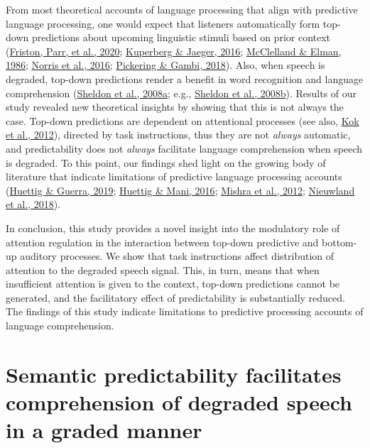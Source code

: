 \documentclass[a4paper, nobind]{templates/ociamthesis}
\begin{document}
From most theoretical accounts of language processing that align with predictive language processing, one would expect that listeners automatically form top-down predictions about upcoming linguistic stimuli based on prior context (\protect\hyperlink{ref-Friston2020}{Friston, Parr, et al., 2020}; \protect\hyperlink{ref-Kuperberg2016}{Kuperberg \& Jaeger, 2016}; \protect\hyperlink{ref-Mcclelland1986}{McClelland \& Elman, 1986}; \protect\hyperlink{ref-Norris2016}{Norris et al., 2016}; \protect\hyperlink{ref-Pickering2018}{Pickering \& Gambi, 2018}).
Also, when speech is degraded, top-down predictions render a benefit in word recognition and language comprehension (\protect\hyperlink{ref-Sheldon2008a}{Sheldon et al., 2008a}; e.g., \protect\hyperlink{ref-Sheldon2008b}{Sheldon et al., 2008b}).
Results of our study revealed new theoretical insights by showing that this is not always the case.
Top-down predictions are dependent on attentional processes (see also, \protect\hyperlink{ref-Kok2012}{Kok et al., 2012}), directed by task instructions, thus they are not \emph{always} automatic, and predictability does not \emph{always} facilitate language comprehension when speech is degraded.
To this point, our findings shed light on the growing body of literature that indicate limitations of predictive language processing accounts (\protect\hyperlink{ref-Huettig2019}{Huettig \& Guerra, 2019}; \protect\hyperlink{ref-Huettig2016}{Huettig \& Mani, 2016}; \protect\hyperlink{ref-Mishra2012}{Mishra et al., 2012}; \protect\hyperlink{ref-Nieuwland2018}{Nieuwland et al., 2018}).

In conclusion, this study provides a novel insight into the modulatory role of attention regulation in the interaction between top-down predictive and bottom-up auditory processes.
We show that task instructions affect distribution of attention to the degraded speech signal.
This, in turn, means that when insufficient attention is given to the context, top-down predictions cannot be generated, and the facilitatory effect of predictability is substantially reduced.
The findings of this study indicate limitations to predictive processing accounts of language comprehension.

\hypertarget{chapter-graded-prediction}{%
\chapter{Semantic predictability facilitates comprehension of degraded speech in a graded manner}\label{chapter-graded-prediction}}
\end{document}
